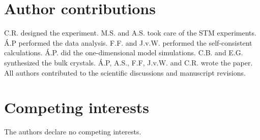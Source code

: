 \documentclass[aps,prl,twocolumn,superscriptaddress]{revtex4-2}
\begin{document}
\section{Author contributions}
C.R. designed the experiment. M.S. and A.S. took care of the STM experiments. \'A.P performed the data analysis. F.F. and J.v.W. performed the self-consistent calculations. \'A.P. did the one-dimensional model simulations. C.B. and E.G. synthesized the bulk crystals. \'A.P, A.S., F.F, J.v.W. and C.R. wrote the paper. All authors contributed to the scientific discussions and manuscript revisions.


\section{Competing interests}
The authors declare no competing interests.


\end{document}
